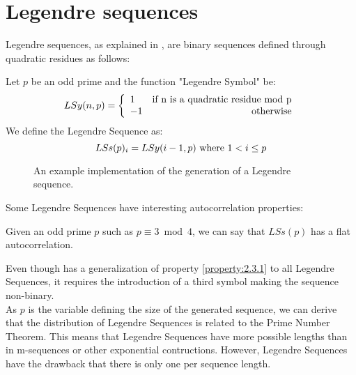 \section{Legendre sequences}

Legendre sequences, as explained in \citet{legendre_sequences}, are binary
sequences defined through quadratic residues as follows:

\begin{definition}
  Let $p$ be an odd prime and the function "Legendre Symbol" be:
    \begin{equation}
      LSy(n, p) = \left\{\begin{array}{lr}
          1  & \textnormal{if n is a quadratic residue mod p}   \\
          -1 & \textnormal{otherwise} \\
      \end{array}\right.
    \end{equation}
  We define the Legendre Sequence as:
    \begin{equation}
      LSs(p)_{i} = LSy(i-1, p) \textnormal{  where  } 1 < i \leq p
    \end{equation}
\end{definition}

\begin{figure}[ht!]
  \caption{An example implementation of the generation of a Legendre sequence.}
  \label{}
\end{figure}

Some Legendre Sequences have interesting autocorrelation properties:
\begin{property}\label{property:2.3.1}
  Given an odd prime $p$ such as $p \equiv 3 \bmod 4$, we can say that
  $LSs(p)$ has a flat autocorrelation.\cite{legendre_sequences}
\end{property}

Even though \citet{legendre_sequences} has a generalization of property
\ref{property:2.3.1} to all Legendre Sequences, it requires the introduction of
a third symbol making the sequence non-binary. \\

As $p$ is the variable defining the size of the generated sequence, we can
derive that the distribution of Legendre Sequences is related to the Prime
Number Theorem. This means that Legendre Sequences have more possible lengths
than in m-sequences or other exponential contructions. However, Legendre
Sequences have the drawback that there is only one per sequence length.
